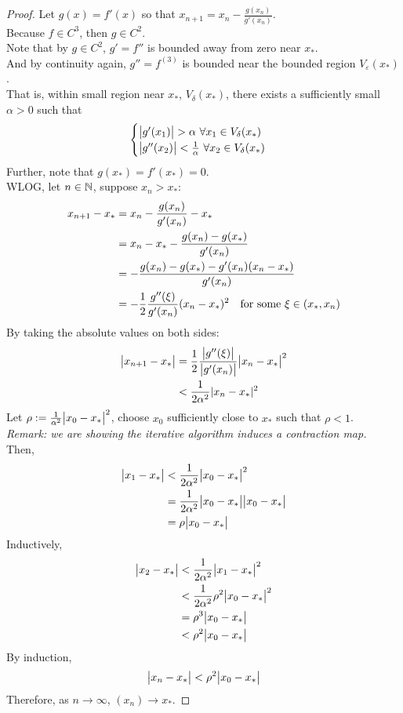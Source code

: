 \documentclass{article}
\begin{document}
	\begin{proof}
		Let $g(x) = f'(x)$ so that $x_{n+1} = x_n - \frac{g(x_n)}{g'(x_n)}$.\\
		Because $f \in C^3$, then $g \in C^2$. \\
		Note that by $g \in C^2$, $g' = f''$ is bounded away from zero near $x_*$. \\
		And by continuity again, $g'' = f^{(3)}$ is bounded near the bounded region $V_\varepsilon(x_*)$. \\
		That is, within small region near $x_*$, $V_\delta(x_*)$, there exists a sufficiently small $\alpha >0$ such that
		\begin{align}
			\begin{cases}
				\big \vert {g'(x_1)} \big \vert > \alpha\ \forall x_1 \in V_\delta(x_*) \\
				\big \vert {g''(x_2)} \big \vert < \frac{1}{\alpha}\ \forall x_2 \in V_\delta(x_*)
			\end{cases}
		\end{align}
		Further, note that $g(x_*) = f'(x_*) = 0$. \\
		WLOG, let $n \in \mathbb{N}$, suppose $x_n > x_*$:
		\begin{align}
			x_{n+1} - x_* &= x_n - \frac{g(x_n)}{g'(x_n)} - x_* \\
			&= x_n - x_* - \frac{g(x_n) - g(x_*)}{g'(x_n)} \\
			&= - \frac{g(x_n) - g(x_*) - g'(x_n)(x_n - x_*)}{g'(x_n)} \\
			&= - \frac{1}{2} \frac{g''(\xi)}{g'(x_n)} (x_n - x_*)^2\quad \text{{for some }} \xi \in (x_*, x_n)
		\end{align}
		By taking the absolute values on both sides:
		\begin{align}
			\big \vert {x_{n+1} - x_*} \big \vert &= \frac{1}{2} \frac{\big \vert {g''(\xi)} \big \vert}{\big \vert {g'(x_n)} \big \vert} \big \vert {x_n - x_*} \big \vert^2 \\
			&< \frac{1}{2 \alpha^2} |x_n - x_*|^2
		\end{align}
		Let $\rho := \frac{1}{\alpha^2} \big \vert {x_0 - x_*} \big \vert^2$, choose $x_0$ sufficiently close to $x_*$ such that $\rho < 1$.\\
		\emph{Remark: we are showing the iterative algorithm induces a contraction map.} \\
		Then,
		\begin{align}
			\big \vert {x_1 - x_*} \big \vert &< \frac{1}{2\alpha^2}\big \vert {x_0 - x_*} \big \vert^2 \\
			&= \frac{1}{2\alpha^2}\big \vert {x_0 - x_*} \big \vert \big \vert {x_0 - x_*} \big \vert \\
			&= \rho \big \vert {x_0 - x_*} \big \vert
		\end{align}
		Inductively,
		\begin{align}
			\big \vert {x_2 - x_*} \big \vert &< \frac{1}{2 \alpha^2} \big \vert {x_1 - x_*} \big \vert^2 \\
			&< \frac{1}{2 \alpha^2} \rho^2 \big \vert {x_0 - x_*} \big \vert^2 \\
			&= \rho^3 \big \vert {x_0 - x_*} \big \vert \\
			&< \rho^2 \big \vert {x_0 - x_*} \big \vert
		\end{align}
		By induction,
		\begin{align}
			\big \vert {x_n - x_*} \big \vert < \rho^2 \big \vert {x_0 - x_*} \big \vert
		\end{align}
		Therefore, as $n \to \infty$, $(x_n) \to x_*$.
	\end{proof}
\end{document}
